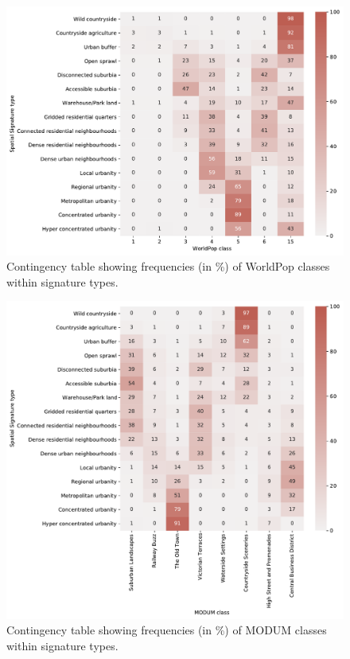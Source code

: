 \documentclass[fleqn,10pt]{wlscirep}
\begin{document}
\begin{figure}[ht]
    \centering
    \includegraphics[width=.8\linewidth]{fig/crosstab_worldpop.pdf}
    \caption{Contingency table showing frequencies (in \%) of WorldPop classes within signature types.}
    \label{fig:crosstab_worldpop}
\end{figure}

\begin{figure}[ht]
    \centering
    \includegraphics[width=.8\linewidth]{fig/crosstab_modum.pdf}
    \caption{Contingency table showing frequencies (in \%) of MODUM classes within signature types.}
    \label{fig:crosstab_modum}
\end{figure}
\end{document}
